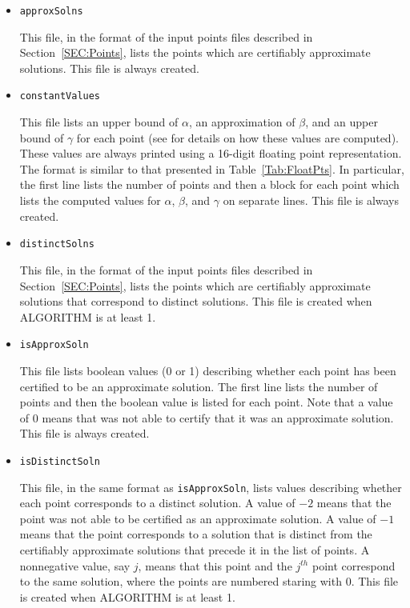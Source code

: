 \documentclass[11pt]{report}
\begin{document}
\begin{itemize}

\item {\tt approxSolns}

This file, in the format of the input points files described in Section~\ref{SEC:Points},
lists the points which are certifiably approximate solutions.  This file is always
created.

\item {\tt constantValues}

This file lists an upper bound of $\alpha$, an approximation of $\beta$, and an upper bound
of $\gamma$ for each point (see \cite{HS10} for details on how these values are computed).
These values are always printed using a 16-digit floating point representation.  The format is similar
to that presented in Table~\ref{Tab:FloatPts}.  In particular, the first line lists the number
of points and then a block for each point which lists the computed values for $\alpha$, $\beta$,
and $\gamma$ on separate lines.  This file is always created.

\item {\tt distinctSolns}

This file, in the format of the input points files described in Section~\ref{SEC:Points},
lists the points which are certifiably approximate solutions that correspond to distinct
solutions.  This file is created when ALGORITHM is at least 1.

\item {\tt isApproxSoln}

This file lists boolean values (0 or 1) describing whether each point has been
certified to be an approximate solution.   The first line lists the number of points
and then the boolean value is listed for each point.  Note that a value of 0 means
that \blueharvestS was not able to certify that it was an approximate solution.
This file is always created.

\item {\tt isDistinctSoln}

This file, in the same format as {\tt isApproxSoln}, lists values describing whether
each point corresponds to a distinct solution.  A value of $-2$ means that the
point was not able to be certified as an approximate solution.  A value of $-1$
means that the point corresponds to a solution that is distinct from the
certifiably approximate solutions that precede it in the list of points.
A nonnegative value, say $j$, means that this point and the $j^{th}$ point
correspond to the same solution, where the points are numbered staring with 0.
This file is created when ALGORITHM is at least 1.


\end{itemize}
\end{document}
